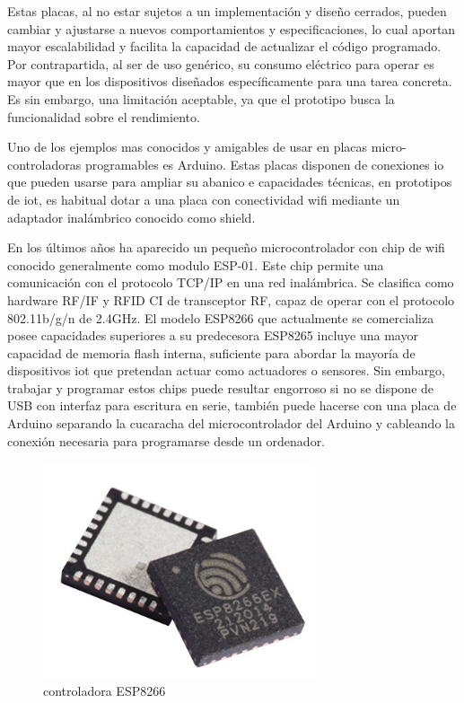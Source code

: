 \vspace{1.5cm}

Estas placas, al no estar sujetos a un implementación y diseño cerrados, pueden cambiar y ajustarse a nuevos comportamientos y especificaciones, lo cual aportan mayor escalabilidad y facilita la capacidad de actualizar el código programado. Por contrapartida, al ser de uso genérico, su consumo eléctrico para operar es mayor que en los dispositivos diseñados específicamente para una tarea concreta. Es sin embargo, una limitación aceptable, ya que el prototipo busca la funcionalidad sobre el rendimiento.

\vspace{1.5cm}

Uno de los ejemplos mas conocidos y amigables de usar en placas micro-controladoras programables es Arduino. Estas placas disponen de conexiones \gls{io} que pueden usarse para ampliar su abanico e capacidades técnicas, en prototipos de \gls{iot}, es habitual dotar a una placa con conectividad \gls{wifi} mediante un adaptador inalámbrico conocido como shield.

\vspace{1.5cm}

En los últimos años ha aparecido un pequeño microcontrolador con chip de \gls{wifi} conocido generalmente como modulo ESP-01. Este chip permite una comunicación con el protocolo TCP/IP en una red inalámbrica. Se clasifica como hardware RF/IF y RFID CI de transceptor RF, capaz de operar con el protocolo 802.11b/g/n de 2.4GHz. El modelo ESP8266 que actualmente se comercializa posee capacidades superiores a su predecesora ESP8265 incluye una mayor capacidad de memoria flash interna, suficiente para abordar la mayoría de dispositivos \gls{iot} que pretendan actuar como actuadores o sensores.
Sin embargo, trabajar y programar estos chips puede resultar engorroso si no se dispone de USB con interfaz para escritura en serie, también puede hacerse con una placa de Arduino separando la cucaracha del microcontrolador del Arduino y cableando la conexión necesaria para programarse desde un ordenador.

\begin{figure}[hbt!]
\centering
\includegraphics[height=2.5in]{figures/esp8266ex.jpg}
\caption[controladora ESP8233]{controladora ESP8266\footnotemark}
\end{figure}

